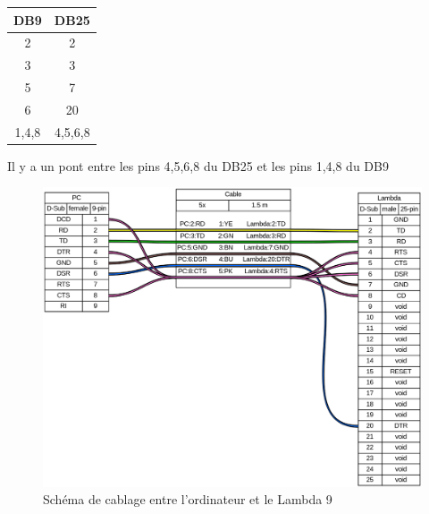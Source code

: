 \documentclass[a4paper, 12pt]{article}
\begin{document}
\begin{table}
\begin{tabular}{|c|c|}
\hline
DB9   & DB25    \\ \hline\hline
2     & 2       \\ \hline
3     & 3       \\ \hline
5     & 7       \\ \hline
6     & 20      \\ \hline
1,4,8 & 4,5,6,8 \\ \hline
\end{tabular}
\end{table}
Il y a un pont entre les pins 4,5,6,8 du DB25 et les pins 1,4,8 du DB9
\begin{figure}[h]
	\centering
	\includegraphics[width=1\textwidth]{cableLambda.png}
	\caption{Schéma de cablage entre l'ordinateur et le Lambda 9 \protect \footnotemark}
	\label{fig:cableLambda}
\end{figure}
\end{document}
